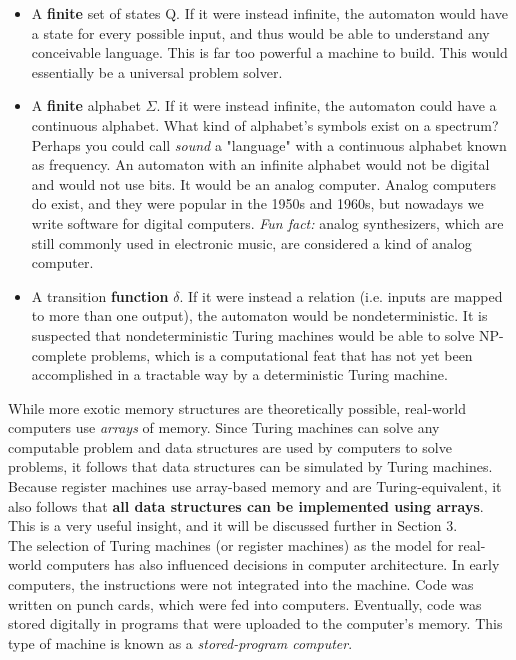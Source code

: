 \begin{tcolorbox}[breakable, enhanced, colback=textbook-blue, sharp corners]
	\begin{itemize}
		\item A \textbf{finite} set of states Q. If it were instead infinite, the automaton would have a state for every possible input, and thus would be able to understand any conceivable language. This is far too powerful a machine to build. This would essentially be a universal problem solver.
		\item A \textbf{finite} alphabet $\Sigma$. If it were instead infinite, the automaton could have a continuous alphabet. What kind of alphabet's symbols exist on a spectrum? Perhaps you could call \textit{sound} a "language" with a continuous alphabet known as frequency. An automaton with an infinite alphabet would not be digital and would not use bits. It would be an analog computer. Analog computers do exist, and they were popular in the 1950s and 1960s, but nowadays we write software for digital computers. \textit{Fun fact:} analog synthesizers, which are still commonly used in electronic music, are considered a kind of analog computer.
		\item A transition \textbf{function} $\delta$. If it were instead a relation (i.e. inputs are mapped to more than one output), the automaton would be nondeterministic. It is suspected that nondeterministic Turing machines would be able to solve NP-complete problems, which is a computational feat that has not yet been accomplished in a tractable way by a deterministic Turing machine.
	\end{itemize}
	\vspace{1mm}
\end{tcolorbox}
\vspace{7mm}

While more exotic memory structures are theoretically possible, real-world computers use \textit{arrays} of memory. Since Turing machines can solve any computable problem and data structures are used by computers to solve problems, it follows that data structures can be simulated by Turing machines. Because register machines use array-based memory and are Turing-equivalent, it also follows that \textbf{all data structures can be implemented using arrays}. This is a very useful insight, and it will be discussed further in Section 3. \\

The selection of Turing machines (or register machines) as the model for real-world computers has also influenced decisions in computer architecture. In early computers, the instructions were not integrated into the machine. Code was written on punch cards, which were fed into computers. Eventually, code was stored digitally in programs that were uploaded to the computer's memory. This type of machine is known as a \textit{stored-program computer}. \\

